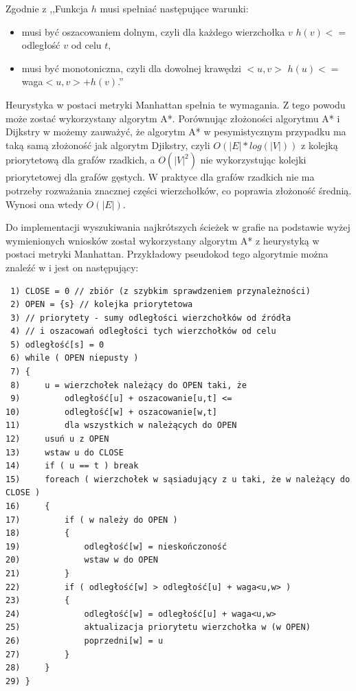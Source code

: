 \documentclass[a4paper,11pt,twoside,openright]{report}
\theoremstyle{definition}
\begin{document}
Zgodnie z \cite{AiSD2} ,,Funkcja $h$ musi spełniać następujące warunki:

\begin{itemize}[noitemsep]
\item musi być oszacowaniem dolnym, czyli dla każdego wierzchołka $v$ $h(v) <=$ odległość $v$ od celu $t$,
\item musi być monotoniczna, czyli dla dowolnej krawędzi $<u,v>$ $h(u) <= $waga$<u,v> + h(v)$.''
\end{itemize}

Heurystyka w postaci metryki Manhattan spełnia te wymagania. Z tego powodu może
zostać wykorzystany algorytm A*. Porównując złożoności algorytmu A* i Dijkstry w
\cite{AiSD2} możemy zauważyć, że algorytm A* w pesymistycznym przypadku ma taką
samą złożoność jak algorytm Djikstry, czyli $O(|E|*log(|V|))$ z kolejką priorytetową
dla grafów rzadkich, a $O(|V|^2)$ nie wykorzystując kolejki priorytetowej dla
grafów gęstych. W praktyce dla grafów rzadkich nie ma potrzeby rozważania znacznej
części wierzchołków, co poprawia złożoność średnią. Wynosi ona wtedy $O(|E|)$.

Do implementacji wyszukiwania najkrótszych ścieżek w grafie na podstawie wyżej
wymienionych wniosków został wykorzystany algorytm A* z heurystyką w postaci
metryki Manhattan. Przykładowy pseudokod tego algorytmie można znaleźć w
\cite{AiSD2} i jest on następujący: %

\begin{verbatim}
 1) CLOSE = 0 // zbiór (z szybkim sprawdzeniem przynależności)
 2) OPEN = {s} // kolejka priorytetowa
 3) // priorytety - sumy odległości wierzchołków od źródła
 4) // i oszacowań odległości tych wierzchołków od celu
 5) odległość[s] = 0
 6) while ( OPEN niepusty )
 7) {
 8)     u = wierzchołek należący do OPEN taki, że
 9)         odległość[u] + oszacowanie[u,t] <=
10)         odległość[w] + oszacowanie[w,t]
11)         dla wszystkich w należących do OPEN
12)     usuń u z OPEN
13)     wstaw u do CLOSE
14)     if ( u == t ) break
15)     foreach ( wierzchołek w sąsiadujący z u taki, że w należący do CLOSE )
16)     {
17)         if ( w należy do OPEN )
18)         {
19)             odległość[w] = nieskończoność
20)             wstaw w do OPEN
21)         }
22)         if ( odległość[w] > odległość[u] + waga<u,w> )
23)         {
24)             odległość[w] = odległość[u] + waga<u,w>
25)             aktualizacja priorytetu wierzchołka w (w OPEN)
26)             poprzedni[w] = u
27)         }
28)     }
29) }
\end{verbatim}
\end{document}
